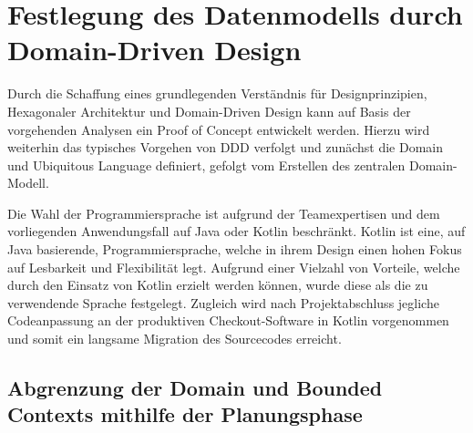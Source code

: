 

\chapter{Festlegung des Datenmodells durch Domain-Driven Design}

Durch die Schaffung eines grundlegenden Verständnis für Designprinzipien, Hexagonaler Architektur und Domain-Driven Design kann auf Basis der vorgehenden Analysen ein Proof of Concept entwickelt werden. Hierzu wird weiterhin das typisches Vorgehen von DDD verfolgt und zunächst die Domain und Ubiquitous Language definiert, gefolgt vom Erstellen des zentralen Domain-Modell. 

Die Wahl der Programmiersprache ist aufgrund der Teamexpertisen und dem vorliegenden Anwendungsfall auf Java oder Kotlin beschränkt. Kotlin ist eine, auf Java basierende, Programmiersprache, welche in ihrem Design einen hohen Fokus auf Lesbarkeit und Flexibilität legt. Aufgrund einer Vielzahl von Vorteile, welche durch den Einsatz von Kotlin erzielt werden können, wurde diese als die zu verwendende Sprache festgelegt. Zugleich wird nach Projektabschluss jegliche Codeanpassung an der produktiven Checkout-Software in Kotlin vorgenommen und somit ein langsame Migration des Sourcecodes erreicht.

\section{Abgrenzung der Domain und Bounded Contexts mithilfe der Planungsphase}

